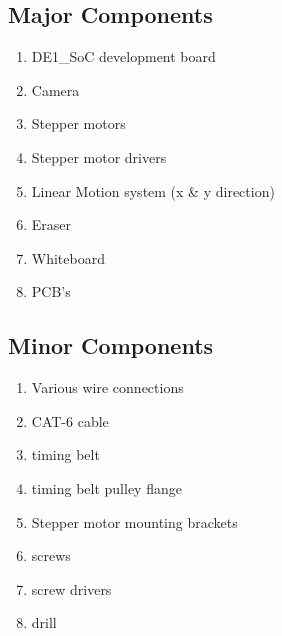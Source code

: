 \subsection{Major Components}
\begin{enumerate}
	\item DE1\_SoC development board
	\item Camera
	\item Stepper motors
	\item Stepper motor drivers
	\item Linear Motion system (x \& y direction)
	\item Eraser
	\item Whiteboard
	\item PCB's
\end{enumerate}
\subsection{Minor Components}
\begin{enumerate}
	\item Various wire connections
	\item CAT-6 cable
	\item timing belt
	\item timing belt pulley flange
	\item Stepper motor mounting brackets
	\item screws
	\item screw drivers
	\item drill
\end{enumerate}


